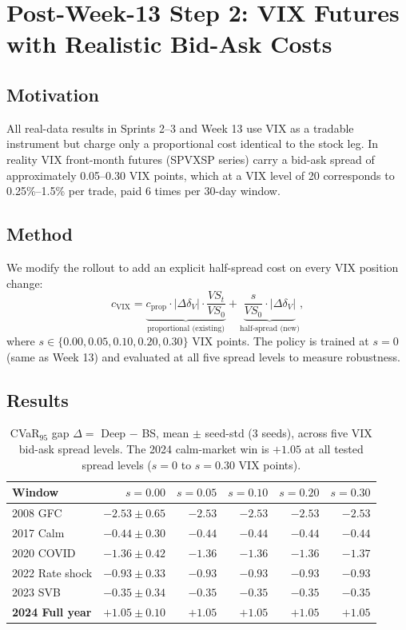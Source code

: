 \documentclass[11pt, a4paper]{article}
\begin{document}
\section{Post-Week-13 Step 2: VIX Futures with Realistic Bid-Ask Costs}
\label{sec:step2}

\subsection{Motivation}

All real-data results in Sprints 2--3 and Week 13 use VIX as a tradable
instrument but charge only a proportional cost identical to the stock
leg. In reality VIX front-month futures (SPVXSP series) carry a bid-ask
spread of approximately 0.05--0.30 VIX points, which at a VIX level of
20 corresponds to 0.25\%--1.5\% per trade, paid 6 times per 30-day
window.

\subsection{Method}

We modify the rollout to add an explicit half-spread cost on every VIX
position change:
\[
c_{\text{VIX}} = \underbrace{c_{\text{prop}} \cdot |\Delta\delta_V| \cdot
  \frac{VS_t}{VS_0}}_{\text{proportional (existing)}}
+ \underbrace{\frac{s}{VS_0} \cdot |\Delta\delta_V|}_{\text{half-spread (new)}},
\]
where $s \in \{0.00, 0.05, 0.10, 0.20, 0.30\}$ VIX points.
The policy is trained at $s = 0$ (same as Week 13) and evaluated at
all five spread levels to measure robustness.

\subsection{Results}

\begin{table}[h!]
\centering
\small
\begin{tabular}{lrrrrr}
\toprule
Window & $s=0.00$ & $s=0.05$ & $s=0.10$ & $s=0.20$ & $s=0.30$ \\
\midrule
2008 GFC     & $-2.53{\pm}0.65$ & $-2.53$ & $-2.53$ & $-2.53$ & $-2.53$ \\
2017 Calm    & $-0.44{\pm}0.30$ & $-0.44$ & $-0.44$ & $-0.44$ & $-0.44$ \\
2020 COVID   & $-1.36{\pm}0.42$ & $-1.36$ & $-1.36$ & $-1.36$ & $-1.37$ \\
2022 Rate shock & $-0.93{\pm}0.33$ & $-0.93$ & $-0.93$ & $-0.93$ & $-0.93$ \\
2023 SVB     & $-0.35{\pm}0.34$ & $-0.35$ & $-0.35$ & $-0.35$ & $-0.35$ \\
\textbf{2024 Full year} & $\mathbf{+1.05{\pm}0.10}$ & $\mathbf{+1.05}$ &
  $\mathbf{+1.05}$ & $\mathbf{+1.05}$ & $\mathbf{+1.05}$ \\
\bottomrule
\end{tabular}
\caption{CVaR$_{95}$ gap $\Delta = $ Deep $-$ BS, mean $\pm$ seed-std
(3 seeds), across five VIX bid-ask spread levels.
The 2024 calm-market win is $+1.05$ at all tested spread levels
($s = 0$ to $s = 0.30$ VIX points).}
\label{tab:step2-spreads}
\end{table}
\end{document}
